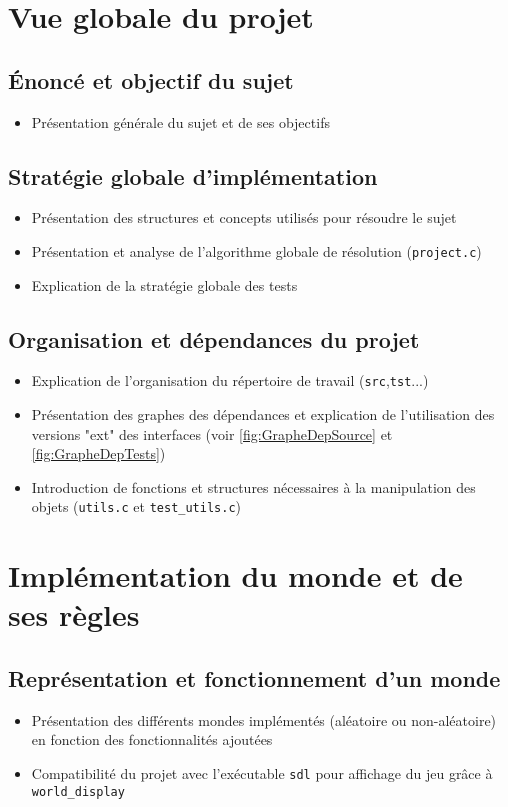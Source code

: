 \section{Vue globale du projet}
\subsection{Énoncé et objectif du sujet}
\begin{itemize}
\item Présentation générale du sujet et de ses objectifs 
\end{itemize}
\subsection{Stratégie globale d'implémentation}
\begin{itemize}
\item Présentation des structures et concepts utilisés pour résoudre le sujet
\item Présentation et analyse de l'algorithme globale de résolution (\texttt{project.c})
\item Explication de la stratégie globale des tests
\end{itemize}
\subsection{Organisation et dépendances du projet}
\begin{itemize}
\item Explication de l'organisation du répertoire de travail (\texttt{src},\texttt{tst}...)
\item Présentation des graphes des dépendances et explication de l'utilisation des versions "ext" des interfaces (voir \autoref{fig:GrapheDepSource} et \autoref{fig:GrapheDepTests})
\item Introduction de fonctions et structures nécessaires à la manipulation des objets (\texttt{utils.c} et \texttt{test\_utils.c})
\end{itemize}

\section{Implémentation du monde et de ses règles}
\subsection{Représentation et fonctionnement d'un monde}
\begin{itemize}
\item Présentation des différents mondes implémentés (aléatoire ou non-aléatoire) en fonction des fonctionnalités ajoutées
\item Compatibilité du projet avec l'exécutable \texttt{sdl} pour affichage du jeu grâce à \texttt{world\_display}
\end{itemize}
